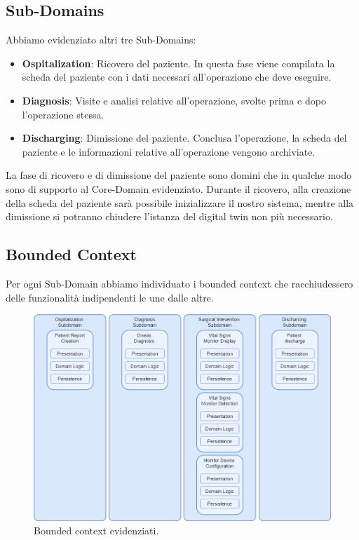 \subsection{Sub-Domains}
Abbiamo evidenziato altri tre Sub-Domains:
\begin{itemize}
    \item \textbf{Ospitalization}: Ricovero del paziente. In questa fase viene compilata la scheda del paziente con i dati necessari all'operazione che deve eseguire.
    
    \item \textbf{Diagnosis}: Visite e analisi relative all'operazione, svolte prima e dopo l'operazione stessa.
    
    \item \textbf{Discharging}: Dimissione del paziente. Conclusa l'operazione, la scheda del paziente e le informazioni relative all'operazione vengono archiviate.
\end{itemize}

La fase di ricovero e di dimissione del paziente sono domini che in qualche modo sono di supporto al Core-Domain evidenziato.
\newline Durante il ricovero, alla creazione della scheda del paziente sarà possibile inizializzare il nostro sistema, mentre alla dimissione si potranno chiudere l'istanza del digital twin non più necessario.

\subsection{Bounded Context}

Per ogni Sub-Domain abbiamo individuato i bounded context che racchiudessero delle funzionalità indipendenti le une dalle altre.

\begin{figure}[H]
    \includegraphics[width=12cm]{Images/bounded_context.png}
    \centering
    \caption{\label{pic:bounded-context}Bounded context evidenziati.}
\end{figure}

